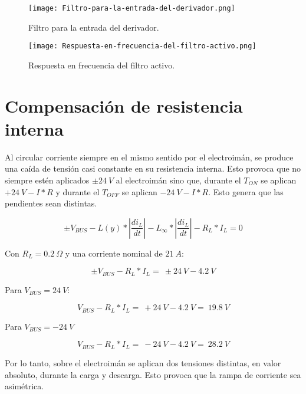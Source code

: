\begin{figure}[H]
	\centering
	\texttt{[image: Filtro-para-la-entrada-del-derivador.png]}
	\caption{Filtro para la entrada del derivador.}
	\label{fig:img_Filtro-para-la-entrada-del-derivador}
\end{figure}

\begin{figure}[H]
	\centering
	\texttt{[image: Respuesta-en-frecuencia-del-filtro-activo.png]}
	\caption{Respuesta en frecuencia del filtro activo.}
	\label{fig:img_Respuesta-en-frecuencia-del-filtro-activo}
\end{figure}

\section{Compensaci\'{o}n de resistencia interna}

\noindent Al circular corriente siempre en el mismo sentido por el electroim\'{a}n, se produce una ca\'{i}da de tensi\'{o}n casi constante en su resistencia interna. Esto provoca que no siempre est\'{e}n aplicados $\pm 24\:V$ al electroim\'{a}n sino que, durante el $T_{ON}$ se aplican $+24\:V-I*R$ y durante el $T_{OFF}$ se aplican $-24\:V-I*R$. Esto genera que las pendientes sean distintas.

\begin{equation} \label{eq_Vbus-didt-RL}
\pm V_{BUS}-L(y)*\left|\frac{{di}_L}{dt}\right|-L_{\infty }*\left|\frac{{di}_L}{dt}\right|-R_L*I_L=0
\end{equation}

\noindent Con  $R_L=0.2 \:\Omega$ y una corriente nominal  de $21\:A$:

\begin{equation} \label{eq_Vbus-didt-RL-2}
\pm V_{BUS}-R_L*I_L=\ \pm 24\:V-4.2\:V
\end{equation}

\noindent Para $V_{BUS}=24\:V$:

\begin{equation} \label{eq_Vbus-didt-RL-3}
	V_{BUS}-R_L*I_L=\ +24\:V-4.2\:V=\ 19.8\:V
\end{equation}

\noindent Para $V_{BUS}=-24\:V$

\begin{equation} \label{eq_Vbus-didt-RL-4}
	V_{BUS}-R_L*I_L=\ -24\:V-4.2\:V=\ 28.2\:V
\end{equation}

\noindent Por lo tanto, sobre el electroim\'{a}n se aplican dos tensiones distintas, en valor absoluto, durante la carga y descarga. Esto provoca que la rampa de corriente sea asim\'{e}trica.

